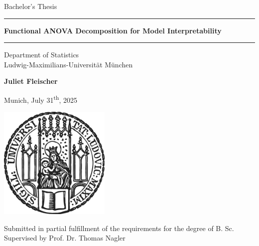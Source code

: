 \documentclass[12pt]{article}
\newcommand{\mytitle}{Functional ANOVA Decomposition for Model Interpretability}
\newcommand{\myname}{Juliet Fleischer}
\newcommand{\mysupervisor}{Prof. Dr. Thomas Nagler}
\begin{document}
 
\begin{titlepage}
\begin{center}
    
\LARGE
Bachelor's Thesis
    
\vspace{0.5cm}
      
\rule{\textwidth}{1.5pt}
\LARGE
\textbf{\mytitle}
\rule{\textwidth}{1.5pt}
   
\vspace{0.5cm}
      
\large
Department of Statistics \\
Ludwig-Maximilians-Universität München 

\vfill

\Large
\textbf{\myname}

\vfill

\large
Munich, July 31\textsuperscript{th}, 2025
      
\vfill

\includegraphics[width = 0.4\textwidth]{sigillum.png}

\vfill

\normalsize
Submitted in partial fulfillment of the requirements for the degree of B. Sc.
\\

Supervised by \mysupervisor

\end{center}
\end{titlepage}


\newpage
\end{document}
